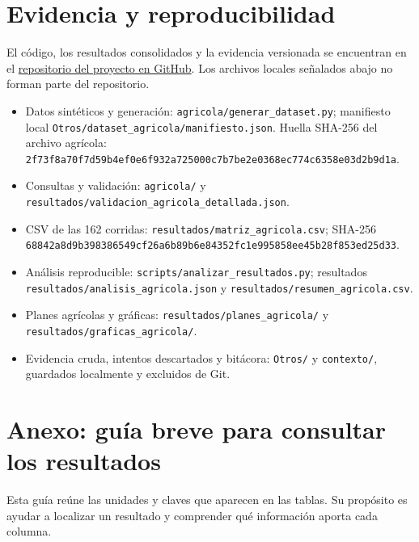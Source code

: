 \documentclass[12pt,letterpaper]{article}
\begin{document}
\clearpage\normalfont\sloppy\section*{Evidencia y reproducibilidad}
El código, los resultados consolidados y la evidencia versionada se encuentran en el \href{https://github.com/uzzigg/Bases-de-datos-orientadas-a-documentos}{repositorio del proyecto en GitHub}. Los archivos locales señalados abajo no forman parte del repositorio.
\begin{itemize}
\item Datos sintéticos y generación: \texttt{agricola/\allowbreak{}generar\_\allowbreak{}dataset.py}; manifiesto local \texttt{Otros/\allowbreak{}dataset\_\allowbreak{}agricola/\allowbreak{}manifiesto.json}. Huella SHA-256 del archivo agrícola: \texttt{2f73f8a70f7d59b4\allowbreak{}ef0e6f932a725000\allowbreak{}c7b7be2e0368ec77\allowbreak{}4c6358e03d2b9d1a}.
\item Consultas y validación: \texttt{agricola/\allowbreak{}} y \texttt{resultados/\allowbreak{}validacion\_\allowbreak{}agricola\_\allowbreak{}detallada.json}.
\item CSV de las 162 corridas: \texttt{resultados/\allowbreak{}matriz\_\allowbreak{}agricola.csv}; SHA-256 \texttt{68842a8d9b398386\allowbreak{}549cf26a6b89b6e8\allowbreak{}4352fc1e995858ee\allowbreak{}45b28f853ed25d33}.
\item Análisis reproducible: \texttt{scripts/\allowbreak{}analizar\_\allowbreak{}resultados.py}; resultados \texttt{resultados/\allowbreak{}analisis\_\allowbreak{}agricola.json} y \texttt{resultados/\allowbreak{}resumen\_\allowbreak{}agricola.csv}.
\item Planes agrícolas y gráficas: \texttt{resultados/\allowbreak{}planes\_\allowbreak{}agricola/\allowbreak{}} y \texttt{resultados/\allowbreak{}graficas\_\allowbreak{}agricola/\allowbreak{}}.
\item Evidencia cruda, intentos descartados y bitácora: \texttt{Otros/\allowbreak{}} y \texttt{contexto/\allowbreak{}}, guardados localmente y excluidos de Git.
\end{itemize}

\clearpage
\section*{Anexo: guía breve para consultar los resultados}
Esta guía reúne las unidades y claves que aparecen en las tablas. Su propósito es ayudar a localizar un resultado y comprender qué información aporta cada columna.
\end{document}
